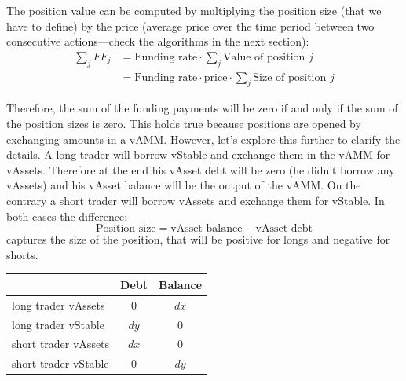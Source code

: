 \documentclass{article}
\begin{document}
The position value can be computed by multiplying the position size (that we have to
define) by the price (average price over the time period between two consecutive
actions---check the algorithms in the next section):
\begin{align}
\sum_j FF_j &= \text{Funding rate} \cdot \sum_j \text{Value of position } j \\
            &= \text{Funding rate} \cdot \text{price} \cdot \sum_j \text{Size of position } j
\end{align}

Therefore, the sum of the funding payments will be zero if and only if the sum of the
position sizes is zero. This holds true because positions are opened by exchanging amounts
in a vAMM. However, let's explore this further to clarify the details. A long trader will
borrow vStable and exchange them in the vAMM for vAssets. Therefore at the end his vAsset
debt will be zero (he didn't borrow any vAssets) and his vAsset balance will be the output
of the vAMM. On the contrary a short trader will borrow vAssets and exchange them for
vStable. In both cases the difference:
\begin{equation}
\text{Position size} = \text{vAsset balance} - \text{vAsset debt}
\end{equation}
captures the size of the position, that will be positive for longs and negative for shorts.

\begin{center}
\begin{tabular}{lcc}
\hline
 & Debt & Balance \\
\hline
long trader vAssets  & $0$  & $dx$ \\
long trader vStable  & $dy$ & $0$  \\
short trader vAssets & $dx$ & $0$  \\
short trader vStable & $0$  & $dy$ \\
\hline
\end{tabular}
\end{center}
\end{document}
